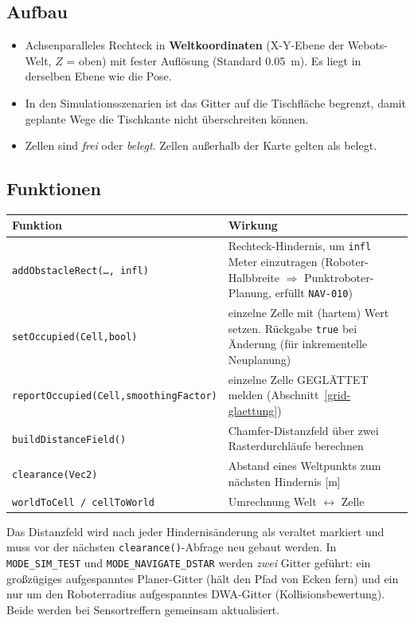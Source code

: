 \documentclass[
  a4paper,
  12pt,
  DIV=12,        %
  parskip=half,  %
  headings=small %
]{scrartcl}
\theoremstyle{definition}
\providecommand{\tightlist}{%
  \setlength{\itemsep}{0pt}\setlength{\parskip}{0pt}}
\theoremstyle{definition}
\begin{document}
\subsection{Aufbau}\label{grid-aufbau}

\begin{itemize}
\tightlist
\item
  Achsenparalleles Rechteck in \textbf{Weltkoordinaten} (X-Y-Ebene der
  Webots-Welt, $Z$ = oben) mit fester Auflösung (Standard
  \SI{0.05}{\meter}). Es liegt in derselben Ebene wie die Pose.
\item
  In den Simulationsszenarien ist das Gitter auf die Tischfläche
  begrenzt, damit geplante Wege die Tischkante nicht überschreiten können.
\item
  Zellen sind \emph{frei} oder \emph{belegt}. Zellen außerhalb der Karte
  gelten als belegt.
\end{itemize}

\subsection{Funktionen}\label{grid-funktionen}

\begin{longtable}[]{@{}p{}p{}@{}}
\toprule
\textbf{Funktion} & \textbf{Wirkung}\\
\midrule
\endhead
\texttt{addObstacleRect(\ldots,\,infl)} & Rechteck-Hindernis, um \texttt{infl} Meter einzutragen (Roboter-Halbbreite $\Rightarrow$ Punktroboter-Planung, erfüllt \texttt{NAV-010})\\
\texttt{setOccupied(Cell,bool)} & einzelne Zelle mit (hartem) Wert setzen. Rückgabe \texttt{true} bei Änderung (für inkrementelle Neuplanung)\\
\texttt{reportOccupied(Cell,\allowbreak smoothingFactor)} & einzelne Zelle GEGLÄTTET melden (Abschnitt~\ref{grid-glaettung})\\
\texttt{buildDistanceField()} & Chamfer-Distanzfeld über zwei Rasterdurchläufe berechnen\\
\texttt{clearance(Vec2)} & Abstand eines Weltpunkts zum nächsten Hindernis [m]\\
\texttt{worldToCell / cellToWorld} & Umrechnung Welt $\leftrightarrow$ Zelle\\
\bottomrule
\end{longtable}

Das Distanzfeld wird nach jeder Hindernisänderung als veraltet markiert
und muss vor der nächsten \texttt{clearance()}-Abfrage neu gebaut
werden. In \texttt{MODE\_SIM\_TEST} und \texttt{MODE\_NAVIGATE\_DSTAR}
werden \emph{zwei} Gitter geführt: ein großzügiges aufgespanntes
Planer-Gitter (hält den Pfad von Ecken fern) und ein nur um den
Roboterradius aufgespanntes DWA-Gitter (Kollisionsbewertung). Beide
werden bei Sensortreffern gemeinsam aktualisiert.
\end{document}
